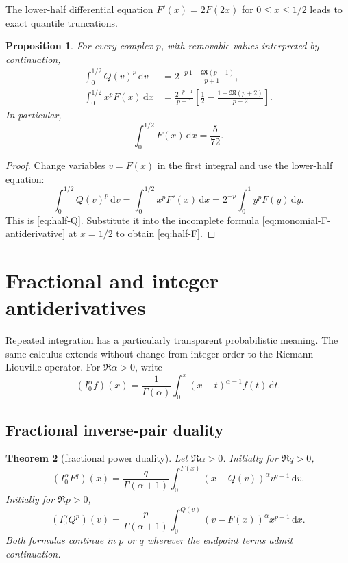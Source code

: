 \documentclass[11pt,oneside]{article}
\newtheorem{theorem}{Theorem}[section]
\newtheorem{proposition}[theorem]{Proposition}
\theoremstyle{definition}
\newcommand{\F}{F}
\newcommand{\Q}{Q}
\newcommand{\M}{\mathfrak M}
\newcommand{\dd}{\,\mathrm d}
\begin{document}
The lower-half differential equation \(\F'(x)=2\F(2x)\) for \(0\le x\le1/2\)
leads to exact quantile truncations.

\begin{proposition}\label{prop:half-identities}
For every complex \(p\), with removable values interpreted by continuation,
\begin{align}
 \int_0^{1/2}\Q(v)^p\dd v
 &=2^{-p}\frac{1-\M(p+1)}{p+1},
 \label{eq:half-Q}\\
 \int_0^{1/2}x^p\F(x)\dd x
 &=\frac{2^{-p-1}}{p+1}
 \left[\frac12-\frac{1-\M(p+2)}{p+2}\right].
 \label{eq:half-F}
\end{align}
In particular,
\begin{equation}\label{eq:half-F-zero}
 \int_0^{1/2}\F(x)\dd x=\frac5{72}.
\end{equation}
\end{proposition}

\begin{proof}
Change variables \(v=\F(x)\) in the first integral and use the lower-half equation:
\[
 \int_0^{1/2}\Q(v)^p\dd v
 =\int_0^{1/2}x^p\F'(x)\dd x
 =2^{-p}\int_0^1y^p\F(y)\dd y.
\]
This is \cref{eq:half-Q}.  Substitute it into the incomplete formula
\cref{eq:monomial-F-antiderivative} at \(x=1/2\) to obtain \cref{eq:half-F}.
\end{proof}

\section{Fractional and integer antiderivatives}

Repeated integration has a particularly transparent probabilistic meaning.  The same
calculus extends without change from integer order to the Riemann--Liouville operator.
For \(\Re\alpha>0\), write
\begin{equation}\label{eq:RLdef}
 (I_0^\alpha f)(x)
 =\frac1{\Gamma(\alpha)}\int_0^x(x-t)^{\alpha-1}f(t)\dd t.
\end{equation}

\subsection{Fractional inverse-pair duality}

\begin{theorem}[fractional power duality]\label{thm:fractional-duality}
Let \(\Re\alpha>0\).  Initially for \(\Re q>0\),
\begin{equation}\label{eq:RL-Fq}
 (I_0^\alpha\F^q)(x)
 =\frac{q}{\Gamma(\alpha+1)}
 \int_0^{\F(x)}(x-\Q(v))^\alpha v^{q-1}\dd v.
\end{equation}
Initially for \(\Re p>0\),
\begin{equation}\label{eq:RL-Qp}
 (I_0^\alpha\Q^p)(v)
 =\frac{p}{\Gamma(\alpha+1)}
 \int_0^{\Q(v)}(v-\F(x))^\alpha x^{p-1}\dd x.
\end{equation}
Both formulas continue in \(p\) or \(q\) wherever the endpoint terms admit continuation.
\end{theorem}
\end{document}
